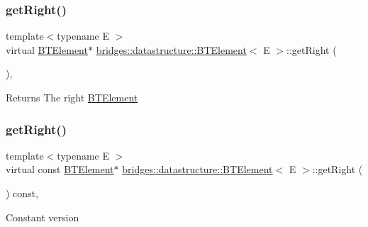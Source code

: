 \subsubsection{\texorpdfstring{get\+Right()}{getRight()}\hspace{0.1cm}{\footnotesize\ttfamily [1/2]}}
{\footnotesize\ttfamily template$<$typename E $>$ \\
virtual \mbox{\hyperlink{classbridges_1_1datastructure_1_1_b_t_element}{B\+T\+Element}}$\ast$ \mbox{\hyperlink{classbridges_1_1datastructure_1_1_b_t_element}{bridges\+::datastructure\+::\+B\+T\+Element}}$<$ E $>$\+::get\+Right (\begin{DoxyParamCaption}{ }\end{DoxyParamCaption})\hspace{0.3cm}{\ttfamily [inline]}, {\ttfamily [virtual]}}

\begin{DoxyReturn}{Returns}
The right \mbox{\hyperlink{classbridges_1_1datastructure_1_1_b_t_element}{B\+T\+Element}} 
\end{DoxyReturn}
\mbox{\label{classbridges_1_1datastructure_1_1_b_t_element_afc0f4e1454bbdfb6a61ae9acf606e22a}} 
\subsubsection{\texorpdfstring{get\+Right()}{getRight()}\hspace{0.1cm}{\footnotesize\ttfamily [2/2]}}
{\footnotesize\ttfamily template$<$typename E $>$ \\
virtual const \mbox{\hyperlink{classbridges_1_1datastructure_1_1_b_t_element}{B\+T\+Element}}$\ast$ \mbox{\hyperlink{classbridges_1_1datastructure_1_1_b_t_element}{bridges\+::datastructure\+::\+B\+T\+Element}}$<$ E $>$\+::get\+Right (\begin{DoxyParamCaption}{ }\end{DoxyParamCaption}) const\hspace{0.3cm}{\ttfamily [inline]}, {\ttfamily [virtual]}}

Constant version \mbox{\label{classbridges_1_1datastructure_1_1_b_t_element_a6baeb1237f1879eb6a04fc144a7b55d6}} 
